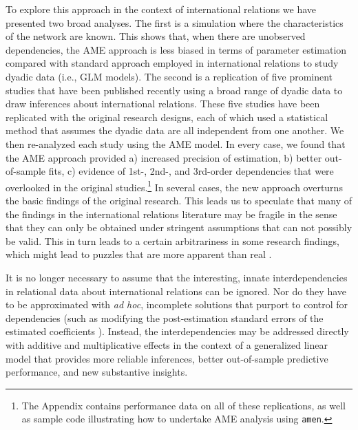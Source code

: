 To explore this approach in the context of international relations we have presented two broad analyses. The first is a simulation where the characteristics of the network are known. This shows that, when there are unobserved dependencies, the AME approach is less biased in terms of parameter estimation compared with standard approach employed in international relations to study dyadic data (i.e., GLM models). The second is a replication of five prominent studies that have been published recently using a broad range of dyadic data to draw inferences about international relations.  These five studies have been replicated with the original research designs, each of which used a statistical method that assumes the dyadic data are all independent from one another.  We then re-analyzed each study using the AME model.  In every case, we found that the AME approach provided a) increased precision of estimation, b) better out-of-sample fits, c) evidence of 1st-, 2nd-, and 3rd-order dependencies that were overlooked in the original studies.\footnote{The Appendix contains performance data on all of these replications, as well as sample code illustrating how to undertake AME analysis using \texttt{amen}.} In several cases, the new approach overturns the basic findings of the original research.  This leads us to speculate that many of the findings in the international relations literature may be fragile in the sense that they can only be obtained under stringent assumptions that can not possibly be valid.  This in turn leads to a certain arbitrariness in some research findings, which might lead to puzzles that are more apparent than real \citep{zinnes:1980}.  

It is no longer necessary to assume that the interesting, innate interdependencies in relational data about international relations can be ignored. Nor do they have to be approximated with \textit{ad hoc}, incomplete solutions that purport to control for dependencies (such as modifying the post-estimation standard errors of the estimated coefficients \citep{king:roberts:2014}). Instead, the interdependencies may be addressed directly with additive and multiplicative effects in the context of a generalized linear model that provides more reliable inferences, better out-of-sample predictive performance, and new substantive insights. 


